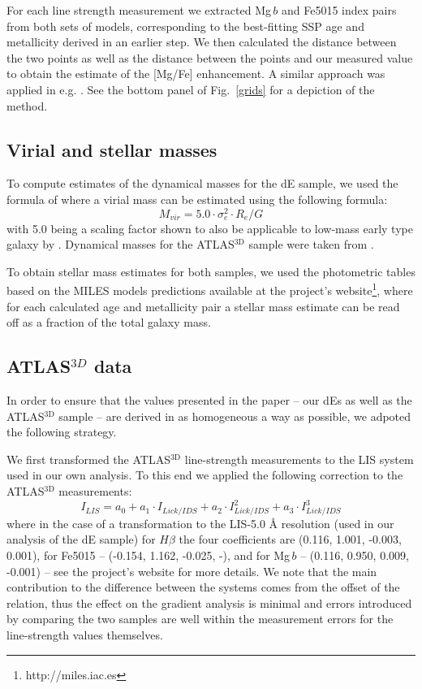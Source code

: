 \documentclass[useAMS,usenatbib]{mn2e}
\newcommand{\atlas}{ATLAS$^{\mathrm{3D}}$}
\newcommand{\mgb}{Mg\,$b$}
\begin{document}
For each line strength measurement we extracted {\mgb} and Fe5015 index pairs from both sets of models, corresponding to the best-fitting SSP age and metallicity derived in an earlier step. We then calculated the distance between the two points as well as the distance between the points and our measured value to obtain the estimate of the [Mg/Fe] enhancement. A similar approach was applied in e.g. \cite{thomas:2005}. See the bottom panel of Fig.~\ref{grids} for a depiction of the method. 

\subsection{Virial and stellar masses}

To compute estimates of the dynamical masses for the dE sample, we used the formula of \cite{cappellari:2006} where a virial mass can be estimated using the following formula:
\begin{equation}
M_{vir} = 5.0 \cdot \sigma_e^2 \cdot R_e/G
\end{equation}
with 5.0 being a scaling factor shown to also be applicable to low-mass early type galaxy by \cite{rys:2014}. Dynamical masses for the {\atlas} sample were taken from \cite{cappellari:2013a}.

To obtain stellar mass estimates for both samples, we used the photometric tables based on the MILES models predictions available at the project's website\footnote{http://miles.iac.es}, where for each calculated age and metallicity pair a stellar mass estimate can be read off as a fraction of the total galaxy mass. 

\subsection{ATLAS$^{3D}$ data} 

In order to ensure that the values presented in the paper -- our dEs as well as the {\atlas} sample -- are derived in as homogeneous a way as possible, we adpoted the following strategy. 

We first transformed the {\atlas} line-strength measurements to the LIS system used in our own analysis. To this end we applied the following correction to the {\atlas} measurements:
\begin{equation}
I_{LIS} = a_0 + a_1 \cdot I_{Lick/IDS} + a_2 \cdot I_{Lick/IDS}^2 + a_3 \cdot I_{Lick/IDS}^3
\end{equation}
where in the case of a transformation to the LIS-5.0 {\AA} resolution (used in our analysis of the dE sample) for $H\beta$ the four coefficients are (0.116, 1.001, -0.003, 0.001), for Fe5015 -- (-0.154, 1.162, -0.025, -), and for {\mgb} -- (0.116, 0.950, 0.009, -0.001) -- see the project's website for more details. We note  that the main contribution to the difference between the systems comes from the offset of the relation, thus the effect on the gradient analysis is minimal and errors introduced by comparing the two samples are well within the measurement errors for the line-strength values themselves. 
\end{document}

